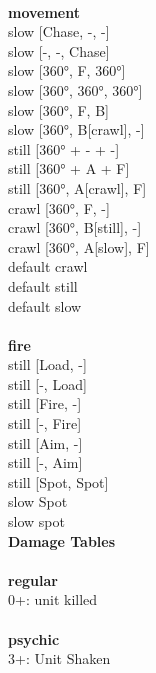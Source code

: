 \ \\ {\bf movement } \\
slow [Chase, -, -] \\
slow [-, -, Chase] \\
slow [360°, F, 360°] \\
slow [360°, 360°, 360°] \\
slow [360°, F, B] \\
slow [360°, B[crawl], -] \\
still [360° + - + -] \\
still [360° + A + F] \\
still [360°, A[crawl], F] \\
crawl [360°, F, -] \\
crawl [360°, B[still], -] \\
crawl [360°, A[slow], F] \\
default crawl \\
default still \\
default slow \\
\ \\ {\bf fire } \\
still [Load, -] \\
still [-, Load] \\
still [Fire, -] \\
still [-, Fire] \\
still [Aim, -] \\
still [-, Aim] \\
still [Spot, Spot] \\
slow Spot \\
slow spot \\


{\bf Damage Tables} \\
\ \\ {\bf regular } \\
0+: unit killed \\
\ \\ {\bf psychic } \\
3+: Unit Shaken \\










